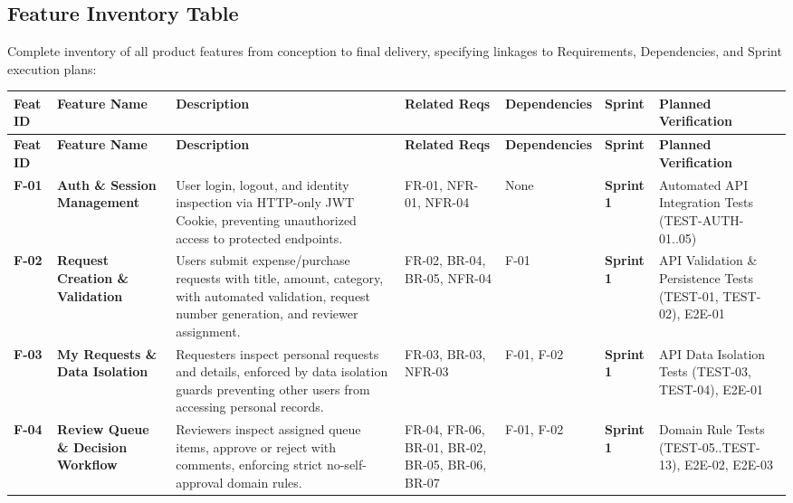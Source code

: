 \documentclass[11pt,a4paper]{article}
\begin{document}
\subsection{Feature Inventory Table}

Complete inventory of all product features from conception to final delivery, specifying linkages to Requirements, Dependencies, and Sprint execution plans:\\


\small
\vspace{0.3em}
\begin{longtable}{|>{\RaggedRight}p{1.1cm}|>{\RaggedRight}p{2.2cm}|>{\RaggedRight}p{3.4cm}|>{\RaggedRight}p{1.6cm}|>{\RaggedRight}p{1.2cm}|>{\centering\arraybackslash}p{1.6cm}|>{\RaggedRight}p{2.8cm}|}
\hline
\rowcolor{zenPale}\textbf{Feat ID} & \textbf{Feature Name} & \textbf{Description} & \textbf{Related Reqs} & \textbf{Dependencies} & \textbf{Sprint} & \textbf{Planned\allowbreak{} Verification} \\ \hline
\endfirsthead
\hline
\rowcolor{zenPale}\textbf{Feat ID} & \textbf{Feature Name} & \textbf{Description} & \textbf{Related Reqs} & \textbf{Dependencies} & \textbf{Sprint} & \textbf{Planned\allowbreak{} Verification} \\ \hline
\endhead
\hline
\endfoot
\textbf{F-01} & \textbf{Auth \& Session Management} & User login, logout, and identity inspection via HTTP-only JWT Cookie, preventing unauthorized access to protected endpoints. & FR-01, NFR-01, NFR-04 & None & \textbf{Sprint 1} & Automated API Integration Tests (TEST-AUTH-01..05) \\ \hline
\textbf{F-02} & \textbf{Request Creation \& Validation} & Users submit expense/purchase requests with title, amount, category, with automated validation, request number generation, and reviewer assignment. & FR-02, BR-04, BR-05, NFR-04 & F-01 & \textbf{Sprint 1} & API Validation \& Persistence Tests (TEST-01, TEST-02), E2E-01 \\ \hline
\textbf{F-03} & \textbf{My Requests \& Data Isolation} & Requesters inspect personal requests and details, enforced by data isolation guards preventing other users from accessing personal records. & FR-03, BR-03, NFR-03 & F-01, F-02 & \textbf{Sprint 1} & API Data Isolation Tests (TEST-03, TEST-04), E2E-01 \\ \hline
\textbf{F-04} & \textbf{Review Queue \& Decision Workflow} & Reviewers inspect assigned queue items, approve or reject with comments, enforcing strict no-self-approval domain rules. & FR-04, FR-06, BR-01, BR-02, BR-05, BR-06, BR-07 & F-01, F-02 & \textbf{Sprint 1} & Domain Rule Tests (TEST-05..TEST-13), E2E-02, E2E-03 \\ \hline

\end{longtable}
\end{document}
